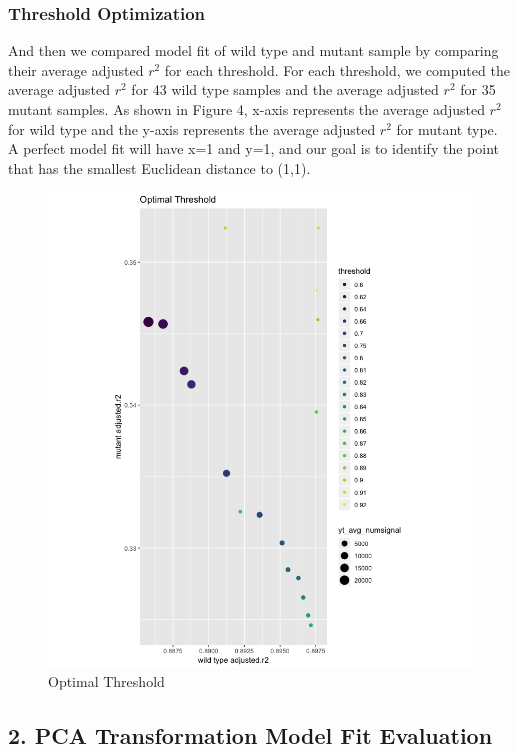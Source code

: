 \documentclass[10pt,letterpaper]{article}
\begin{document}
\subsubsection{Threshold Optimization}\label{threshold-optimization}

And then we compared model fit of wild type and mutant sample by
comparing their average adjusted \(r^2\) for each threshold. For each
threshold, we computed the average adjusted \(r^2\) for 43 wild type
samples and the average adjusted \(r^2\) for 35 mutant samples. As shown
in Figure 4, x-axis represents the average adjusted \(r^2\) for wild
type and the y-axis represents the average adjusted \(r^2\) for mutant
type. A perfect model fit will have x=1 and y=1, and our goal is to
identify the point that has the smallest Euclidean distance to (1,1).

\begin{figure}[H]
\includegraphics[width=1\linewidth]{visualization_paper/optimal_threshold} \caption{Optimal Threshold}\label{fig:Figure4}
\end{figure}

\subsection{2. PCA Transformation Model Fit
Evaluation}\label{pca-transformation-model-fit-evaluation}
\end{document}
